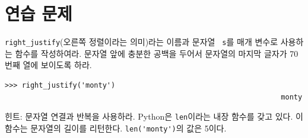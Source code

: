 \documentclass[10pt]{book}
\begin{document}
\section{연습 문제}

\begin{exercise}

\verb"right_justify"(오른쪽 정렬이라는 의미)라는 이름과 문자열 {\tt
  s}를 매개 변수로 사용하는 함수를 작성하여라.  문자열 앞에 충분한
공백을 두어서 문자열의 마지막 글자가 70번째 열에 보이도록 하라.

\begin{verbatim}
>>> right_justify('monty')
                                                                 monty
\end{verbatim}

힌트: 문자열 연결과 반복을 사용하라.  Python은 {\tt len}이라는 내장
함수를 갖고 있다.  이 함수는 문자열의 길이를 리턴한다.
\verb"len('monty')"의 값은 5이다.

\end{exercise}
\end{document}
